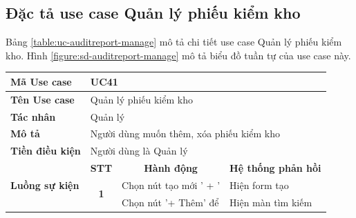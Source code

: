\documentclass[../DoAn.tex]{subfiles}
\begin{document}
\subsection{Đặc tả use case Quản lý phiếu kiểm kho}
\label{section:uc-auditreport-manage}
Bảng \ref{table:uc-auditreport-manage} mô tả chi tiết use case Quản lý phiếu kiểm kho. Hình \ref{figure:sd-auditreport-manage} mô tả biểu đồ tuần tự của use case này.
\begin{table}[H]
    \begin{tabular}{|l|c|l|l|}
        \hline
        \textbf{Mã Use case}                     & \multicolumn{3}{l|}{UC41}                                                                                                                                   \\ \hline
        \textbf{Tên Use case}                    & \multicolumn{3}{l|}{Quản lý phiếu kiểm kho}                                                                                                                 \\ \hline
        \textbf{Tác nhân}                        & \multicolumn{3}{l|}{Quản lý}                                                                                                                                \\ \hline
        \textbf{Mô tả}                           & \multicolumn{3}{l|}{Người dùng muốn thêm, xóa phiếu kiểm kho}                                                                                               \\ \hline
        \textbf{Tiền điều kiện}                  & \multicolumn{3}{l|}{Người dùng là Quản lý}                                                                                                                  \\ \hline
        \multirow{14}{*}{\textbf{Luồng sự kiện}} & \multicolumn{1}{c|}{\textbf{STT}}                             & \multicolumn{1}{c|}{\textbf{Hành động}}   & \multicolumn{1}{c|}{\textbf{Hệ thống phản hồi}} \\ \cline{2-4}
                                                 & \multirow{10}{*}{\textbf{1}}                                  & Chọn nút tạo mới ' + '                    & Hiện form tạo                                   \\ \cline{3-4}
                                                 &                                                               & Chọn nút '+ Thêm' để                      & Hiện màn tìm kiếm                               \\

\end{tabular}
\end{table}
\end{document}
